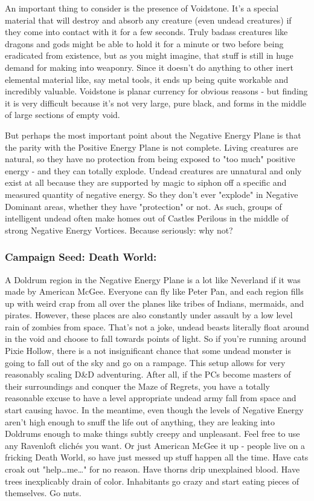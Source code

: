An important thing to consider is the presence of Voidstone. It's a special material that will destroy and absorb any creature (even undead creatures) if they come into contact with it for a few seconds. Truly badass creatures like dragons and gods might be able to hold it for a minute or two before being eradicated from existence, but as you might imagine, that stuff is still in huge demand for making into weaponry. Since it doesn't do anything to other inert elemental material like, say metal tools, it ends up being quite workable and incredibly valuable. Voidstone is planar currency for obvious reasons - but finding it is very difficult because it's not very large, pure black, and forms in the middle of large sections of empty void.

But perhaps the most important point about the Negative Energy Plane is that the parity with the Positive Energy Plane is not complete. Living creatures are natural, so they have no protection from being exposed to "too much" positive energy - and they can totally explode. Undead creatures are unnatural and only exist at all because they are supported by magic to siphon off a specific and measured quantity of negative energy. So they don't ever "explode" in Negative Dominant areas, whether they have "protection" or not. As such, groups of intelligent undead often make homes out of Castles Perilous in the middle of strong Negative Energy Vortices. Because seriously: why not?

\subsubsection{Campaign Seed: Death World:} A Doldrum region in the Negative Energy Plane is a lot like Neverland if it was made by American McGee. Everyone can fly like Peter Pan, and each region fills up with weird crap from all over the planes like tribes of Indians, mermaids, and pirates. However, these places are also constantly under assault by a low level rain of zombies from space. That's not a joke, undead beasts literally float around in the void and choose to fall towards points of light. So if you're running around Pixie Hollow, there is a not insignificant chance that some undead monster is going to fall out of the sky and go on a rampage. This setup allows for very reasonably scaling D\&D adventuring. After all, if the PCs become masters of their surroundings and conquer the Maze of Regrets, you have a totally reasonable excuse to have a level appropriate undead army fall from space and start causing havoc. In the meantime, even though the levels of Negative Energy aren't high enough to snuff the life out of anything, they are leaking into Doldrums enough to make things subtly creepy and unpleasant. Feel free to use any Ravenloft clichés you want. Or just American McGee it up - people live on a fricking Death World, so have just messed up stuff happen all the time. Have cats croak out "help\ldots me\ldots" for no reason. Have thorns drip unexplained blood. Have trees inexplicably drain of color. Inhabitants go crazy and start eating pieces of themselves. Go nuts.


